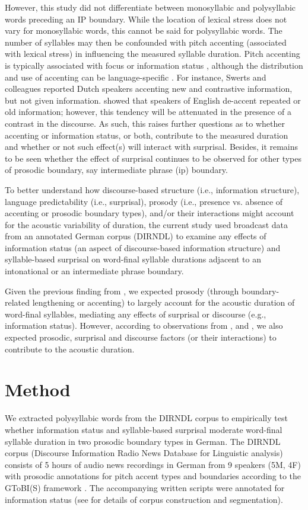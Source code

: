 \documentclass[output=paper,colorlinks,citecolor=brown]{langscibook}
\begin{document}
However, this study did not differentiate between monosyllabic and polysyllabic words preceding an IP boundary. While the location of lexical stress does not vary for monosyllabic words, this cannot be said for polysyllabic words. The number of syllables may then be confounded with pitch accenting (associated with lexical stress) in influencing the measured syllable duration. Pitch accenting is typically associated with focus or information status \citep[e.g.,][]{Cooper1985, Cruttenden1993, Cruttenden2006}, although the distribution and use of accenting can be language-specific  \citep[e.g.,][]{Swerts2002}. For instance, Swerts and colleagues reported Dutch speakers accenting new and contrastive information, but not given information. \citet{Cruttenden1993} showed that speakers of English de-accent repeated or old information; however, this tendency will be attenuated in the presence of a contrast in the discourse. As such, this raises further questions as to whether accenting or information status, or both, contribute to the measured duration and whether or not such effect(s) will interact with surprisal. Besides, it remains to be seen whether the effect of surprisal continues to be observed for other types of prosodic boundary, say intermediate phrase (ip) boundary.

To better understand how discourse-based structure (i.e., information structure), language predictability (i.e., surprisal), prosody (i.e., presence vs. absence of accenting or prosodic boundary types), and/or their interactions might account for the acoustic variability of duration, the current study used broadcast data from an annotated German corpus (DIRNDL) to examine any effects of information status (an aspect of discourse-based information structure) and syllable-based surprisal on word-final syllable durations adjacent to an intonational or an intermediate phrase boundary.

Given the previous finding from \citet{Aylett2004}, we expected prosody (through boundary-related lengthening or accenting) to largely account for the acoustic duration of word-final syllables, mediating any effects of surprisal or discourse (e.g., information status). However, according to observations from \citet{Baker2009}, \citet{Andreeva2020} and \citet{Ibrahim2022}, we also expected prosodic, surprisal and discourse factors (or their interactions) to contribute to the acoustic duration. 

 \section{Method}
We extracted polysyllabic words from the DIRNDL corpus to empirically test whether information status and syllable-based surprisal moderate word-final syllable duration in two prosodic boundary types in German. The DIRNDL corpus (Discourse Information Radio News Database for Linguistic analysis) consists of 5 hours of audio news recordings in German from 9 speakers (5M, 4F) with prosodic annotations for pitch accent types and boundaries according to the GToBI(S) framework \citep{Mayer1995}. The accompanying written scripts were annotated for information status (see \cite{Eckart2012} for details of corpus construction and segmentation).
\end{document}
